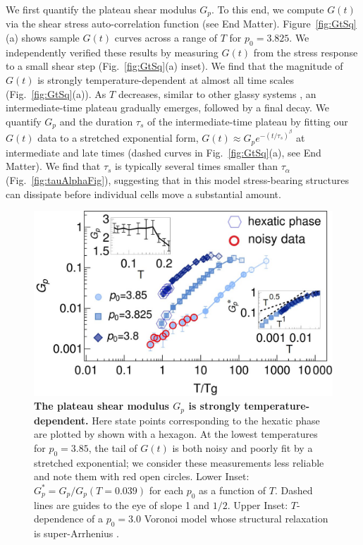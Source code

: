 \documentclass[aps,reprint,superscriptaddress,nofootinbib, notitlepage,prl]{revtex4-2}
\begin{document}
We first quantify the plateau shear modulus $G_p$.
To this end, we compute $G(t)$ via the shear stress auto-correlation function (see End Matter).
Figure~\ref{fig:GtSq}(a) shows sample $G(t)$ curves across a range of $T$ for $p_0=3.825$.
We independently verified these results by measuring $G(t)$ from the stress response to a small shear step (Fig.~\ref{fig:GtSq}(a) inset).
We find that the magnitude of $G(t)$ is strongly temperature-dependent at almost all time scales (Fig.~\ref{fig:GtSq}(a)).
As $T$ decreases, similar to other glassy systems \cite{flenner2019viscoelastic,puosi2012communication}, an intermediate-time plateau gradually emerges, followed by a final decay.
We quantify $G_p$ and the duration $\tau_s$ of the intermediate-time plateau by fitting our $G(t)$ data to a stretched exponential form, $G(t)\approx G_p e^{-(t/\tau_s)^\beta}$ at intermediate and late times (dashed curves in Fig.~\ref{fig:GtSq}(a), see End Matter).
We find that $\tau_s$ is typically several times smaller than $\tau_\alpha$ (Fig.~\ref{fig:tauAlphaFig}), suggesting that in this model stress-bearing structures can dissipate before individual cells move a substantial amount.

\begin{figure}[b]
	\centering
	\includegraphics[width=1\linewidth]{Gp.jpg}
	\caption{\textbf{The plateau shear modulus $G_p$ is strongly temperature-dependent.}
		Here state points corresponding to the hexatic phase are plotted by shown with a hexagon.
		At the lowest temperatures for $p_0=3.85$, the tail of $G(t)$ is both noisy and poorly fit by a stretched exponential; we consider these measurements less reliable and note them with red open circles.
		Lower Inset: $G_p^*=G_p/G_p(T=0.039)$ for each $p_0$ as a function of $T$.
		Dashed lines are guides to the eye of slope 1 and $1/2$.
        Upper Inset: $T$-dependence of a $p_0=3.0$ Voronoi model whose structural relaxation is super-Arrhenius \cite{li2021softness}.
    }
	\label{fig:gpT}
\end{figure}
\end{document}
